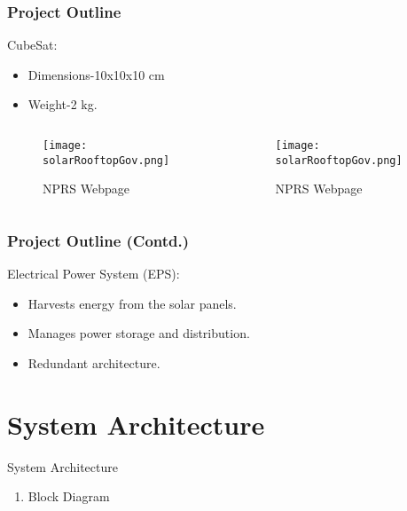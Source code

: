 \documentclass[aspectratio=169]{beamer}
\begin{document}
\begin{frame}
	\frametitle{Project Outline	}
	CubeSat:
	\begin{itemize}
	
	\item Dimensions-10x10x10 cm 
	\item Weight-2 kg.
	\end{itemize}
	\begin{columns}[c] %
		\begin{column}{0.45\textwidth} %
			\begin{figure}
				\texttt{[image: solarRooftopGov.png]}
				\caption{NPRS Webpage}
			\end{figure}
		\end{column}
		\begin{column}{0.5\textwidth} %
			\begin{figure}
				\texttt{[image: solarRooftopGov.png]}
				\caption{NPRS Webpage}
			\end{figure}
			
		\end{column}
	\end{columns}
 \end{frame}


\begin{frame}
	\frametitle{Project Outline (Contd.)}
 	Electrical Power System (EPS):
 	\begin{itemize}
 		
 		\item Harvests energy from the solar panels.
 		\item Manages power storage and distribution.
 		\item Redundant architecture.
 	\end{itemize}
\end{frame}


\section{System Architecture}
\begin{frame}{System Architecture}
	
	
	\begin{enumerate}
		\item Block Diagram
	\end{enumerate}
	
	
\end{frame}
\end{document}
